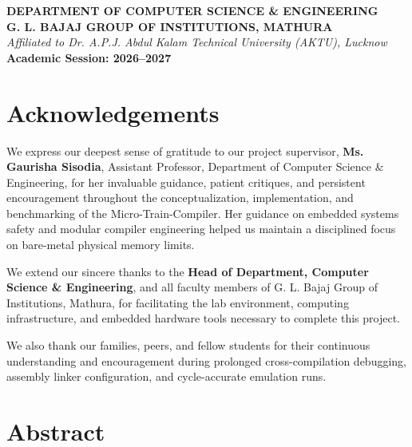 \documentclass[12pt,a4paper]{report}
\begin{document}
\begin{titlepage}
\begin{center}
    {\large \textbf{DEPARTMENT OF COMPUTER SCIENCE \& ENGINEERING}}\\
    {\Large \textbf{G. L. BAJAJ GROUP OF INSTITUTIONS, MATHURA}}\\
    \textit{Affiliated to Dr. A.P.J. Abdul Kalam Technical University (AKTU), Lucknow}\\[0.3cm]
    \textbf{Academic Session: 2026--2027}
\end{center}
\end{titlepage}

\setcounter{page}{1}

\chapter*{Acknowledgements}

We express our deepest sense of gratitude to our project supervisor, \textbf{Ms. Gaurisha Sisodia}, Assistant Professor, Department of Computer Science \& Engineering, for her invaluable guidance, patient critiques, and persistent encouragement throughout the conceptualization, implementation, and benchmarking of the Micro-Train-Compiler. Her guidance on embedded systems safety and modular compiler engineering helped us maintain a disciplined focus on bare-metal physical memory limits.

We extend our sincere thanks to the \textbf{Head of Department, Computer Science \& Engineering}, and all faculty members of G. L. Bajaj Group of Institutions, Mathura, for facilitating the lab environment, computing infrastructure, and embedded hardware tools necessary to complete this project.

We also thank our families, peers, and fellow students for their continuous understanding and encouragement during prolonged cross-compilation debugging, assembly linker configuration, and cycle-accurate emulation runs.

\newpage

\chapter*{Abstract}
\end{document}
